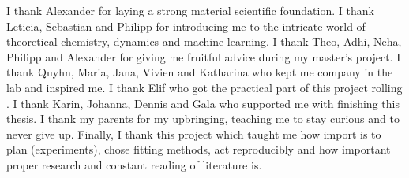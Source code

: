 I thank Alexander for laying a strong material scientific foundation.
I thank Leticia, Sebastian and Philipp for introducing me to the intricate world of theoretical chemistry, dynamics and machine learning. 
I thank Theo, Adhi, Neha, Philipp and Alexander for giving me fruitful advice during my master's project.
I thank Quyhn, Maria, Jana, Vivien and Katharina who kept me company in the lab and inspired me. 
I thank Elif who got the practical part of this project rolling .
I thank Karin, Johanna, Dennis and Gala who supported me with finishing this thesis. 
I thank my parents for my upbringing, teaching me to stay curious and to never give up.
Finally, I thank this project which taught me how import is to plan (experiments), chose fitting methods, act reproducibly and how important proper research and constant reading of literature is. 
